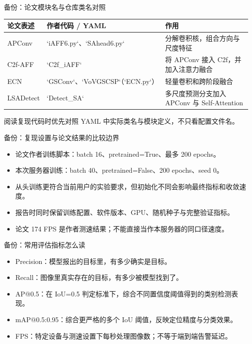 \documentclass[aspectratio=169,10pt]{ctexbeamer}
\begin{document}
\begin{frame}{备份：论文模块名与仓库类名对照}
\centering
\vspace{3pt}
\renewcommand{\arraystretch}{1.25}
\begin{tabularx}{.93\textwidth}{l l X}
\toprule
论文表述 & 作者代码 / YAML & 作用\\ \midrule
APConv & `iAFF6.py`、`SAhead6.py` & 分解卷积核，组合方向与尺度特征\\
C2f-AFF & `C2f\_iAFF` & 将 APConv 接入 C2f，并加入注意力融合\\
ECN & `GSConv`、`VoVGSCSP`（`ECN.py`） & 轻量卷积和跨阶段融合\\
LSADetect & `Detect\_SA` & 多尺度预测分支加入 APConv 与 Self-Attention\\
\bottomrule
\end{tabularx}
\vspace{.25cm}\small 阅读复现代码时优先对照 YAML 中实际类名与模块定义，不只看配置文件名。
\end{frame}

\begin{frame}{备份：复现设置与论文结果的比较边界}
\begin{itemize}
\item 论文作者训练脚本：batch 16、pretrained=True、最多 200 epochs。
\item 本次服务器训练：batch 40、pretrained=False、200 epochs、seed 0。
\item 从头训练更符合当前用户的实验要求，但初始化不同会影响最终指标和收敛速度。
\item 报告时同时保留训练配置、软件版本、GPU、随机种子与完整验证指标。
\item 论文 174 FPS 是作者测速结果；不能直接当作本服务器的同口径速度。
\end{itemize}
\end{frame}

\begin{frame}{备份：常用评估指标怎么读}
\begin{itemize}
\item Precision：模型报出的目标里，有多少确实是目标。
\item Recall：图像里真实存在的目标，有多少被模型找到了。
\item AP@0.5：在 IoU=0.5 判定标准下，综合不同置信度阈值得到的类别检测表现。
\item mAP@0.5:0.95：综合更严格的多个 IoU 阈值，反映定位精度与分类效果。
\item FPS：特定设备与测速设置下每秒处理图像数；不等于端到端告警延迟。
\end{itemize}
\end{frame}
\end{document}
